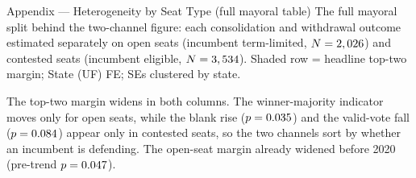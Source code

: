 
\begin{frame}{Appendix --- Heterogeneity by Seat Type (full mayoral table)}
\hypertarget{app:seathet}{}
\small
The full mayoral split behind the two-channel figure: each consolidation and withdrawal outcome estimated separately on open seats (incumbent term-limited, $N=2,026$) and contested seats (incumbent eligible, $N=3,534$). Shaded row = headline top-two margin; State (UF) FE; SEs clustered by state.
\vspace{-2pt}
\begin{center}
\scriptsize
\resizebox{!}{0.29\textheight}{}
\end{center}
\vspace{-2pt}
\footnotesize The top-two margin widens in both columns. The winner-majority indicator moves only for open seats, while the blank rise ($p=0.035$) and the valid-vote fall ($p=0.084$) appear only in contested seats, so the two channels sort by whether an incumbent is defending. The open-seat margin already widened before 2020 (pre-trend $p=0.047$).\hfill\hyperlink{app:seatdisengage}{}\,\hyperlink{src:seathet}{}
\end{frame}
